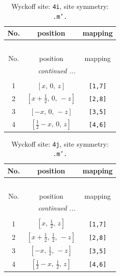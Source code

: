 \documentclass[fleqn,8pt]{jsarticle}
\begin{document}
\renewcommand{\arraystretch}{1.2}
\begin{longtable}{ccc}
\caption{Wyckoff site: {\tt 4i}, site symmetry: {\tt .m'.}}
 \\
 \hline \hline
No. & position & mapping \\ \hline \endfirsthead

\multicolumn{2}{l}{\tablename\ \thetable{}} \\
 \hline \hline
No. & position & mapping \\ \hline \endhead

 \hline \hline
\multicolumn{2}{r}{\footnotesize\it continued ...} \\ \endfoot

 \hline \hline
\multicolumn{2}{r}{} \\ \endlastfoot

1 & $\left[ x,\, 0,\, z \right]$ & {\tt [1,7]} \\ \hline
2 & $\left[ x + \frac{1}{2},\, 0,\, - z \right]$ & {\tt [2,8]} \\ \hline
3 & $\left[ - x,\, 0,\, - z \right]$ & {\tt [3,5]} \\ \hline
4 & $\left[ \frac{1}{2} - x,\, 0,\, z \right]$ & {\tt [4,6]} \\
\end{longtable}
\renewcommand{\arraystretch}{1.2}
\begin{longtable}{ccc}
\caption{Wyckoff site: {\tt 4j}, site symmetry: {\tt .m'.}}
 \\
 \hline \hline
No. & position & mapping \\ \hline \endfirsthead

\multicolumn{2}{l}{\tablename\ \thetable{}} \\
 \hline \hline
No. & position & mapping \\ \hline \endhead

 \hline \hline
\multicolumn{2}{r}{\footnotesize\it continued ...} \\ \endfoot

 \hline \hline
\multicolumn{2}{r}{} \\ \endlastfoot

1 & $\left[ x,\, \frac{1}{2},\, z \right]$ & {\tt [1,7]} \\ \hline
2 & $\left[ x + \frac{1}{2},\, \frac{1}{2},\, - z \right]$ & {\tt [2,8]} \\ \hline
3 & $\left[ - x,\, \frac{1}{2},\, - z \right]$ & {\tt [3,5]} \\ \hline
4 & $\left[ \frac{1}{2} - x,\, \frac{1}{2},\, z \right]$ & {\tt [4,6]} \\
\end{longtable}
\end{document}
